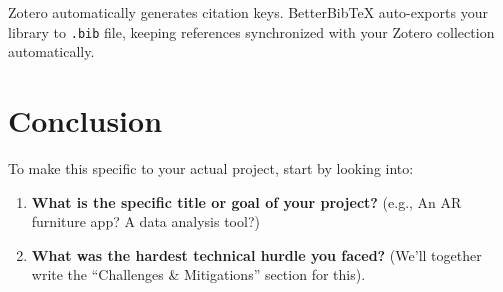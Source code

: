 \documentclass{tietreport}
\begin{document}
Zotero automatically generates citation
keys. BetterBibTeX auto-exports your
library to \texttt{.bib} file, keeping
references synchronized with your Zotero
collection automatically.

\chapter{Conclusion}

To make this specific to your actual project, start by
looking into:

\begin{enumerate}
\item \textbf{What is the specific title or goal of
    your project?} (e.g., An AR furniture app? A data
  analysis tool?)
\item \textbf{What was the hardest technical hurdle you
    faced?} (We’ll together write the ``Challenges \&
  Mitigations'' section for this).
\end{enumerate}

\printbibliography[heading=bibintoc]
\end{document}
